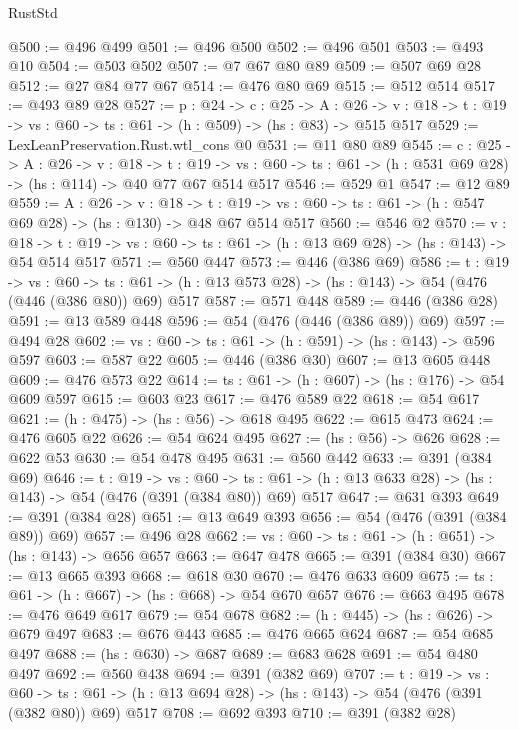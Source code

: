 \begin{lexlean}{RustStd}
\begin{coremodule}
@500 := @496 @499
@501 := @496 @500
@502 := @496 @501
@503 := @493 @10
@504 := @503 @502
@507 := @7 @67 @80 @89
@509 := @507 @69 @28
@512 := @27 @84 @77 @67
@514 := @476 @80 @69
@515 := @512 @514
@517 := @493 @89 @28
@527 := {p : @24} ->
  {c : @25} ->
  {A : @26} ->
  {v : @18} -> {t : @19} -> {vs : @60} -> {ts : @61} -> (h : @509) -> (hs : @83) -> @515 @517
@529 := LexLeanPreservation.Rust.wtl_cons @0
@531 := @11 @80 @89
@545 := {c : @25} ->
  {A : @26} ->
  {v : @18} ->
  {t : @19} ->
  {vs : @60} -> {ts : @61} -> (h : @531 @69 @28) -> (hs : @114) -> @40 @77 @67 @514 @517
@546 := @529 @1
@547 := @12 @89
@559 := {A : @26} ->
  {v : @18} ->
  {t : @19} -> {vs : @60} -> {ts : @61} -> (h : @547 @69 @28) -> (hs : @130) -> @48 @67 @514 @517
@560 := @546 @2
@570 := {v : @18} ->
  {t : @19} -> {vs : @60} -> {ts : @61} -> (h : @13 @69 @28) -> (hs : @143) -> @54 @514 @517
@571 := @560 @447
@573 := @446 (@386 @69)
@586 := {t : @19} ->
  {vs : @60} ->
  {ts : @61} -> (h : @13 @573 @28) -> (hs : @143) -> @54 (@476 (@446 (@386 @80)) @69) @517
@587 := @571 @448
@589 := @446 (@386 @28)
@591 := @13 @589 @448
@596 := @54 (@476 (@446 (@386 @89)) @69)
@597 := @494 @28
@602 := {vs : @60} -> {ts : @61} -> (h : @591) -> (hs : @143) -> @596 @597
@603 := @587 @22
@605 := @446 (@386 @30)
@607 := @13 @605 @448
@609 := @476 @573 @22
@614 := {ts : @61} -> (h : @607) -> (hs : @176) -> @54 @609 @597
@615 := @603 @23
@617 := @476 @589 @22
@618 := @54 @617
@621 := (h : @475) -> (hs : @56) -> @618 @495
@622 := @615 @473
@624 := @476 @605 @22
@626 := @54 @624 @495
@627 := (hs : @56) -> @626
@628 := @622 @53
@630 := @54 @478 @495
@631 := @560 @442
@633 := @391 (@384 @69)
@646 := {t : @19} ->
  {vs : @60} ->
  {ts : @61} -> (h : @13 @633 @28) -> (hs : @143) -> @54 (@476 (@391 (@384 @80)) @69) @517
@647 := @631 @393
@649 := @391 (@384 @28)
@651 := @13 @649 @393
@656 := @54 (@476 (@391 (@384 @89)) @69)
@657 := @496 @28
@662 := {vs : @60} -> {ts : @61} -> (h : @651) -> (hs : @143) -> @656 @657
@663 := @647 @478
@665 := @391 (@384 @30)
@667 := @13 @665 @393
@668 := @618 @30
@670 := @476 @633 @609
@675 := {ts : @61} -> (h : @667) -> (hs : @668) -> @54 @670 @657
@676 := @663 @495
@678 := @476 @649 @617
@679 := @54 @678
@682 := (h : @445) -> (hs : @626) -> @679 @497
@683 := @676 @443
@685 := @476 @665 @624
@687 := @54 @685 @497
@688 := (hs : @630) -> @687
@689 := @683 @628
@691 := @54 @480 @497
@692 := @560 @438
@694 := @391 (@382 @69)
@707 := {t : @19} ->
  {vs : @60} ->
  {ts : @61} -> (h : @13 @694 @28) -> (hs : @143) -> @54 (@476 (@391 (@382 @80)) @69) @517
@708 := @692 @393
@710 := @391 (@382 @28)

\end{coremodule}
\end{lexlean}
